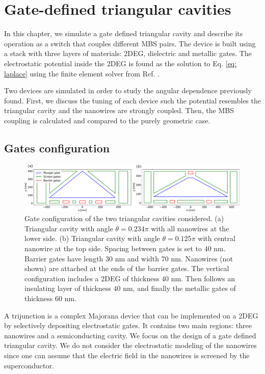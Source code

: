 \chapter{Gate-defined triangular cavities}

In this chapter, we simulate a gate defined triangular cavity and describe its operation as a switch that couples different MBS pairs.
The device is built using a stack with three layers of materials: 2DEG, dielectric and metallic gates.
The electrostatic potential inside the 2DEG is found as the solution to Eq. \eqref{eq: laplace} using the finite element solver from Ref. \cite{Armagnat2019}.

Two devices are simulated in order to study the angular dependence previously found.
First, we discuss the tuning of each device such the potential resembles the triangular cavity and the nanowires are strongly coupled.
Then, the MBS coupling is calculated and compared to the purely geometric case.

\section{Gates configuration}

\begin{figure}[h!]
\centering
  \includegraphics[width=\linewidth]{figures/gate_configurations.pdf}
  \caption{Gate configuration of the two triangular cavities considered. (a) Triangular cavity with angle $\theta = 0.234 \pi$ with all nanowires at the lower side. (b) Triangular cavity with angle $\theta = 0.125\pi$ with central nanowire at the top side. Spacing between gates is set to $40$ nm. Barrier gates have length $30$ nm and width $70$ nm. Nanowires (not shown) are attached at the ends of the barrier gates. The vertical configuration includes a 2DEG of thickness $40$ nm. Then follows an insulating layer of thickness $40$ nm, and finally the metallic gates of thickness $60$ nm.}
  \label{fig:gates}
\end{figure}

A trijunction is a complex Majorana device that can be implemented on a 2DEG by selectively depositing electrostatic gates.
It contains two main regions: three nanowires and a semiconducting cavity.
We focus on the design of a gate defined triangular cavity.
We do not consider the electrostatic modeling of the nanowires since one can assume that the electric field in the nanowires is screened by the superconductor.

